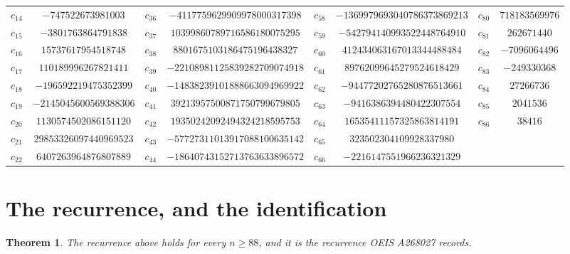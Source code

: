 \documentclass[11pt,a4paper]{article}
\theoremstyle{plain}
\newtheorem{theorem}{Theorem}
\theoremstyle{definition}
\begin{document}
\begin{center}
\begin{tabular}{cccccccc}
$c_{14}$ & $-747522673981003$ & $c_{36}$ & $-4117759629909978000317398$ & $c_{58}$ & $-1369979693040786373869213$ & $c_{80}$ & $718183569976$ \\
$c_{15}$ & $-3801763864791838$ & $c_{37}$ & $10399860789716586180075295$ & $c_{59}$ & $-542794140993522448764910$ & $c_{81}$ & $262671440$ \\
$c_{16}$ & $15737617954518748$ & $c_{38}$ & $8801675103186475196438327$ & $c_{60}$ & $412434063167013344488484$ & $c_{82}$ & $-7096064496$ \\
$c_{17}$ & $110189996267821411$ & $c_{39}$ & $-22108981125839282709074918$ & $c_{61}$ & $89762099645279524618429$ & $c_{83}$ & $-249330368$ \\
$c_{18}$ & $-196592219475352399$ & $c_{40}$ & $-14838239101888663094969922$ & $c_{62}$ & $-94477202765280876513661$ & $c_{84}$ & $27266736$ \\
$c_{19}$ & $-2145045600569388306$ & $c_{41}$ & $39213957500871750799679805$ & $c_{63}$ & $-9416386394480422307554$ & $c_{85}$ & $2041536$ \\
$c_{20}$ & $1130574502086151120$ & $c_{42}$ & $19350242092494324218595753$ & $c_{64}$ & $16535411157325863814191$ & $c_{86}$ & $38416$ \\
$c_{21}$ & $29853326097440969523$ & $c_{43}$ & $-57727311013917088100635142$ & $c_{65}$ & $323502304109928337980$ &  &  \\
$c_{22}$ & $6407263964876807889$ & $c_{44}$ & $-18640743152713763633896572$ & $c_{66}$ & $-2216147551966236321329$ &  &  \\
\end{tabular}
\end{center}

\section{The recurrence, and the identification}

\begin{theorem}
The recurrence above holds for every $n\ge88$, and it is the recurrence OEIS A268027 records.
\end{theorem}
\end{document}
